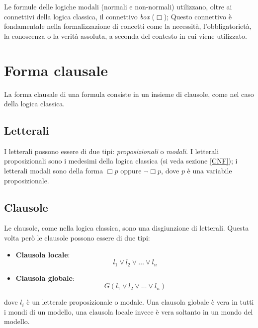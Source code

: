 \documentclass[a4paper,12pt]{report}
\begin{document}
Le formule delle logiche modali (normali e non-normali) utilizzano, oltre ai connettivi della logica classica, il connettivo \emph{box} ($\Box$); Questo connettivo è fondamentale nella formalizzazione di concetti come la necessità, l'obbligatorietà, la conoscenza o la verità assoluta, a seconda del contesto in cui viene utilizzato.

\section{Forma clausale}
La forma clausale di una formula consiste in un insieme di clausole, come nel caso della logica classica.
\subsection{Letterali}
I letterali possono essere di due tipi: \emph{proposizionali} o \emph{modali}. I letterali proposizionali sono i medesimi della logica classica (si veda sezione \ref{CNF}); i letterali modali sono della forma $\Box p$ oppure $\lnot \Box p$, dove $p$ è una variabile proposizionale.
\subsection{Clausole}
Le clausole, come nella logica classica, sono una disgiunzione di letterali. Questa volta però le clausole possono essere di due tipi: 
\begin{itemize}
    \item \textbf{Clausola locale}: \[ l_1 \lor l_2 \lor \ldots \lor l_n \]
    \item \textbf{Clausola globale}: \[ G(l_1 \lor l_2 \lor \ldots \lor l_n) \]
\end{itemize}
dove $l_i$ è un letterale proposizionale o modale. Una clausola globale è vera in tutti i mondi di un modello, una clausola locale invece è vera soltanto in un mondo del modello.
\end{document}
